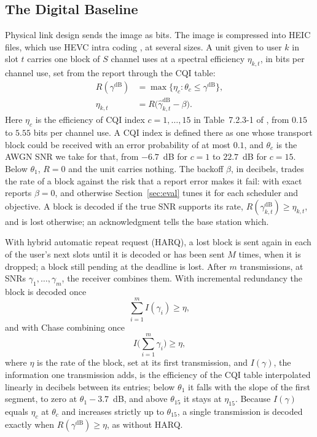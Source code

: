 \subsection{The Digital Baseline}
\label{sec:system-digital}

Physical link design sends the image as bits. The image is compressed into HEIC files, which use
HEVC intra coding \cite{Sullivan12}, at several sizes. A unit given to user $k$ in slot $t$ carries one
block of $S$ channel uses at a spectral efficiency $\eta_{k,t}$, in bits per channel use, set from
the report through the CQI table:
\begin{equation}
\begin{aligned}
R(\gamma^{\mathrm{dB}}) &= \max \big\{ \eta_c : \theta_c \le \gamma^{\mathrm{dB}} \big\}, \\
\eta_{k,t} &= R\big(\hat\gamma^{\mathrm{dB}}_{k,t} - \beta\big).
\end{aligned}
\label{eq:cqi}
\end{equation}
Here $\eta_c$ is the efficiency of CQI index $c = 1, \dots, 15$ in Table~7.2.3-1 of
\cite{TS36213}, from $0.15$ to $5.55$ bits per channel use. A CQI index is defined there as one
whose transport block could be received with an error probability of at most $0.1$, and
$\theta_c$ is the AWGN SNR we take for that, from $-6.7$~dB for $c = 1$ to $22.7$~dB for
$c = 15$. Below $\theta_1$, $R = 0$ and the unit carries nothing. The backoff $\beta$, in
decibels, trades the rate of a block against the risk that a report error makes it fail: with
exact reports $\beta = 0$, and otherwise Section~\ref{sec:eval} tunes it for each scheduler and
objective. A block is decoded if the true SNR supports its rate,
$R(\gamma^{\mathrm{dB}}_{k,t}) \ge \eta_{k,t}$, and is lost otherwise; an acknowledgment tells
the base station which.

With hybrid automatic repeat request (HARQ), a lost block is sent again in each of the user's
next slots until it is decoded or has been sent $M$ times, when it is dropped; a block still
pending at the deadline is lost. After $m$ transmissions, at SNRs $\gamma_1, \dots, \gamma_m$,
the receiver combines them. With incremental redundancy \cite{Caire01} the block is decoded once
\begin{equation}
\sum_{i=1}^{m} I(\gamma_i) \ge \eta,
\label{eq:harq-ir}
\end{equation}
and with Chase combining \cite{Chase85} once
\begin{equation}
I\Big( \sum_{i=1}^{m} \gamma_i \Big) \ge \eta,
\label{eq:harq-cc}
\end{equation}
where $\eta$ is the rate of the block, set at its first transmission, and $I(\gamma)$, the
information one transmission adds, is the efficiency of the CQI table interpolated linearly in
decibels between its entries; below $\theta_1$ it falls with the slope of the first segment, to
zero at $\theta_1 - 3.7$~dB, and above $\theta_{15}$ it stays at $\eta_{15}$. Because $I(\gamma)$
equals $\eta_c$ at $\theta_c$ and increases strictly up to $\theta_{15}$, a single transmission is
decoded exactly when $R(\gamma^{\mathrm{dB}}) \ge \eta$, as without HARQ.


